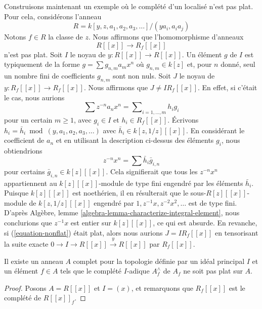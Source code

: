 \noindent
Construisons maintenant un exemple où le complété d'un localisé
n'est pas plat. Pour cela, considérons l'anneau
$$
R = k[y, z, a_1, a_2, a_3, \ldots]/(ya_i, a_i a_j)
$$
Notons $f \in R$ la classe de $z$. Nous affirmons que l'homomorphisme d'anneaux
\begin{equation}
\label{equation-nonflat}
R[[x]] \longrightarrow R_f[[x]]
\end{equation}
n'est pas plat. Soit $I$ le noyau de $y : R[[x]] \to R[[x]]$. Un
élément $g$ de $I$ est typiquement de la forme $g = \sum g_{n, m} a_mx^n$
où $g_{n, m} \in k[z]$ et, pour $n$ donné, seul un nombre fini de
coefficients $g_{n, m}$ sont non nuls. Soit $J$ le noyau de $y : R_f[[x]] \to R_f[[x]]$.
Nous affirmons que $J \not = I R_f[[x]]$. En effet, si c'était le cas, nous
aurions
$$
\sum z^{-n} a_n x^n = \sum\nolimits_{i = 1, \ldots, m} h_i g_i
$$
pour un certain $m \geq 1$, avec $g_i \in I$ et $h_i \in R_f[[x]]$. Écrivons
$h_i = \bar h_i \bmod (y, a_1, a_2, a_3, \ldots)$
avec $\bar h_i \in k[z, 1/z][[x]]$. En considérant le coefficient de
$a_n$ et en utilisant la description ci-dessus des éléments $g_i$, nous obtiendrions
$$
z^{-n} x^n = \sum \bar h_i \bar g_{i, n}
$$
pour certains $\bar g_{i, n} \in k[z][[x]]$. Cela signifierait que
tous les $z^{-n}x^n$ appartiennent au $k[z][[x]]$-module de type fini
engendré par les éléments $\bar h_i$. Puisque $k[z][[x]]$ est noethérien,
il en résulterait que le sous-$R[z][[x]]$-module de $k[z, 1/z][[x]]$
engendré par $1, z^{-1}x, z^{-2}x^2, \ldots$ est de type fini. D'après
Algèbre, lemme \ref{algebra-lemma-characterize-integral-element},
nous conclurions que $z^{-1}x$ est entier sur $k[z][[x]]$,
ce qui est absurde. En revanche,
si (\ref{equation-nonflat}) était plat, alors nous
aurions $J = IR_f[[x]]$ en tensorisant la suite exacte
$0 \to I \to R[[x]] \xrightarrow{y} R[[x]]$ par $R_f[[x]]$.

\begin{lemma}
\label{lemma-nonflat-completion-localization}
Il existe un anneau $A$ complet pour la topologie définie par un idéal principal $I$
et un élément $f \in A$ tels que le complété $I$-adique
$A_f^\wedge$ de $A_f$ ne soit pas plat sur $A$.
\end{lemma}

\begin{proof}
Posons $A = R[[x]]$ et $I = (x)$, et remarquons que $R_f[[x]]$
est le complété de $R[[x]]_f$.
\end{proof}





